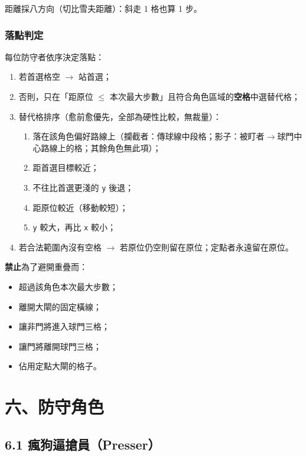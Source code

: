 \documentclass[11pt]{article}
\newcommand{\coord}[1]{\texttt{#1}}
\begin{document}
\vspace{0.4em}
\noindent
距離採八方向（切比雪夫距離）：斜走 1 格也算 1 步。

\subsubsection*{落點判定}

每位防守者依序決定落點：

\begin{enumerate}
  \item 若首選格空 $\rightarrow$ 站首選；
  \item 否則，只在「距原位 $\leq$ 本次最大步數」且符合角色區域的\textbf{空格}中選替代格；
  \item 替代格排序（愈前愈優先，全部為硬性比較，無裁量）：
  \begin{enumerate}
    \item 落在該角色偏好路線上（攔截者：傳球線中段格；影子：被盯者$\rightarrow$球門中心路線上的格；其餘角色無此項）；
    \item 距首選目標較近；
    \item 不往比首選更淺的 \coord{y} 後退；
    \item 距原位較近（移動較短）；
    \item \coord{y} 較大，再比 \coord{x} 較小；
  \end{enumerate}
  \item 若合法範圍內沒有空格 $\rightarrow$ 若原位仍空則留在原位；定點者永遠留在原位。
\end{enumerate}

\textbf{禁止}為了避開重疊而：

\begin{itemize}
  \item 超過該角色本次最大步數；
  \item 離開大閘的固定橫線；
  \item 讓非門將進入球門三格；
  \item 讓門將離開球門三格；
  \item 佔用定點大閘的格子。
\end{itemize}

\section*{六、防守角色}

\subsection*{6.1 瘋狗逼搶員（Presser）}
\end{document}

